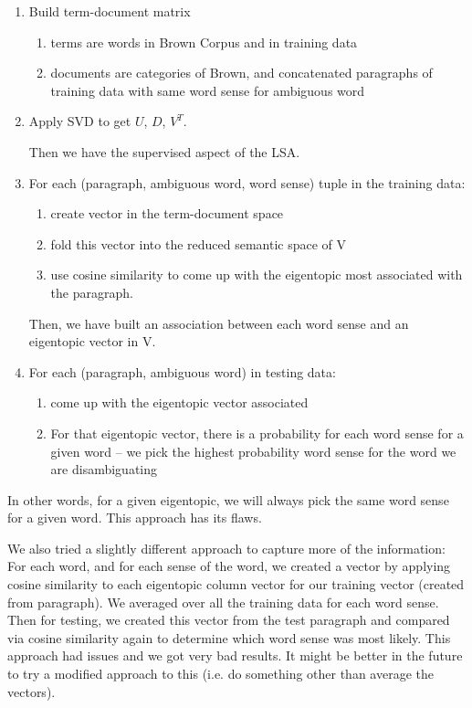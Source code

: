 \documentclass[10pt, letterpaper]{article}
\begin{document}
	\begin{enumerate}

	\item Build term-document matrix 
		\begin{enumerate}
		\item terms are words in Brown Corpus and in training data
		\item documents are categories of Brown, and concatenated paragraphs of training data with same word sense for ambiguous word
		\end{enumerate}
	\item Apply SVD to get $U$, $D$, $V^T$.

	Then we have the supervised aspect of the LSA.  
	\item For each (paragraph, ambiguous word, word sense) tuple in the training data:
		\begin{enumerate}
		\item create vector in the term-document space
		\item fold this vector into the reduced semantic space of V
		\item use cosine similarity to come up with the eigentopic most associated with the paragraph.
		\end{enumerate} 
	Then, we have built an association between each word sense and an eigentopic vector in V. 
	\item For each (paragraph, ambiguous word) in testing data:
		\begin{enumerate}
		\item come up with the eigentopic vector associated
		\item For that eigentopic vector, there is a probability for each word sense for a given word -- we pick the highest probability word sense for the word we are disambiguating
		\end{enumerate}

	\end{enumerate}

	In other words, for a given eigentopic, we will always pick the same word sense for a given word. This approach has its flaws.

	We also tried a slightly different approach to capture more of the information: For each word, and for each sense of the word, we created a vector by applying cosine similarity to each eigentopic column vector for our training vector (created from paragraph). We averaged over all the training data for each word sense. Then for testing, we created this vector from the test paragraph and compared via cosine similarity again to determine which word sense was most likely. 
	This approach had issues and we got very bad results. 
	It might be better in the future to try a modified approach to this (i.e. do something other than average the vectors).
\end{document}
